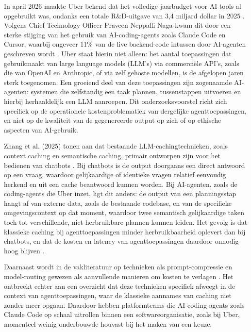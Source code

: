 \documentclass{hogent-article}
\begin{document}
In april 2026 maakte Uber bekend dat het volledige jaarbudget voor AI-tools al opgebruikt was, ondanks een totale R\&D-uitgave van 3,4 miljard dollar in 2025 \autocite{Jain2026}. Volgens Chief Technology Officer Praveen Neppalli Naga kwam dit door een sterke stijging van het gebruik van AI-coding-agents zoals Claude Code en Cursor, waarbij ongeveer 11\% van de live backend-code intussen door AI-agenten geschreven wordt \autocite{Jain2026}. Uber staat hierin niet alleen: het aantal toepassingen dat gebruikmaakt van large language models (LLM's) via commerciële API's, zoals die van OpenAI en Anthropic, of via zelf gehoste modellen, is de afgelopen jaren sterk toegenomen. Een groeiend deel van deze toepassingen zijn zogenaamde AI-agenten: systemen die zelfstandig een taak plannen, tussenstappen uitvoeren en hierbij herhaaldelijk een LLM aanroepen. Dit onderzoeksvoorstel richt zich specifiek op de operationele kostenproblematiek van dergelijke agenttoepassingen, en niet op de kwaliteit van de gegenereerde output op zich of op ethische aspecten van AI-gebruik.

Zhang et al. (2025) tonen aan dat bestaande LLM-cachingtechnieken, zoals context caching en semantische caching, primair ontworpen zijn voor het bedienen van chatbots \autocite{Zhang2025}. Bij chatbots is de output doorgaans een direct antwoord op een vraag, waardoor gelijkaardige of identieke vragen relatief eenvoudig herkend en uit een cache beantwoord kunnen worden. Bij AI-agenten, zoals de coding-agents die Uber inzet, ligt dit anders: de output van een planningsstap hangt af van externe data, zoals de bestaande codebase, en van de specifieke omgevingscontext op dat moment, waardoor twee semantisch gelijkaardige taken toch tot verschillende, niet-herbruikbare plannen kunnen leiden. Het gevolg is dat klassieke caching bij agenttoepassingen minder herbruikbaarheid oplevert dan bij chatbots, en dat de kosten en latency van agenttoepassingen daardoor onnodig hoog blijven \autocite{Zhang2025}.

Daarnaast wordt in de vakliteratuur op technieken als prompt-compressie en model-routing gewezen als aanvullende manieren om kosten te verlagen \autocite{Chen2024}. Het ontbreekt echter aan een overzicht dat deze technieken specifiek afweegt in de context van agenttoepassingen, waar de klassieke aannames van caching niet zonder meer opgaan. Daardoor hebben platformteams die AI-coding-agents zoals Claude Code op schaal uitrollen binnen een softwareorganisatie, zoals bij Uber, momenteel weinig onderbouwde houvast bij het maken van een keuze.
\end{document}
